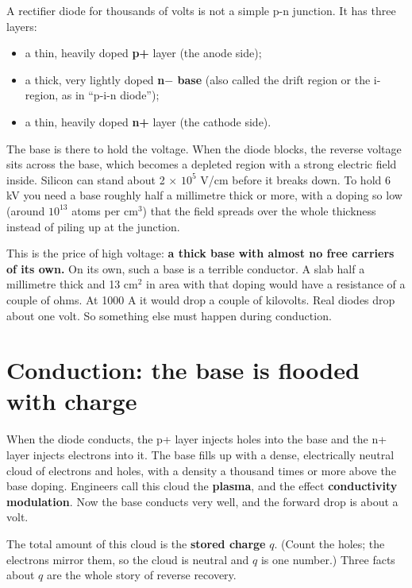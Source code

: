 \documentclass[11pt,a4paper,numbers=noenddot]{scrartcl}
\providecommand{\tightlist}{\setlength{\itemsep}{0pt}\setlength{\parskip}{0pt}}
\begin{document}
\begin{onehalfspace}
A rectifier diode for thousands of volts is not a simple p-n junction. It has three layers:

\begin{itemize}
\tightlist
\item
  a thin, heavily doped \textbf{p+} layer (the anode side);
\item
  a thick, very lightly doped \textbf{n\(-\) base} (also called the drift region or the i-region, as in ``p-i-n diode'');
\item
  a thin, heavily doped \textbf{n+} layer (the cathode side).
\end{itemize}

The base is there to hold the voltage. When the diode blocks, the reverse voltage sits across the base, which becomes a depleted region with a strong electric field inside. Silicon can stand about 2 \(\times\) \(10^{5}\) V/cm before it breaks down. To hold 6 kV you need a base roughly half a millimetre thick or more, with a doping so low (around \(10^{13}\) atoms per cm\(^{3}\)) that the field spreads over the whole thickness instead of piling up at the junction.

This is the price of high voltage: \textbf{a thick base with almost no free carriers of its own.} On its own, such a base is a terrible conductor. A slab half a millimetre thick and 13 cm\(^{2}\) in area with that doping would have a resistance of a couple of ohms. At 1000 A it would drop a couple of kilovolts. Real diodes drop about one volt. So something else must happen during conduction.

\section{Conduction: the base is flooded with charge}\label{conduction-the-base-is-flooded-with-charge}

When the diode conducts, the p+ layer injects holes into the base and the n+ layer injects electrons into it. The base fills up with a dense, electrically neutral cloud of electrons and holes, with a density a thousand times or more above the base doping. Engineers call this cloud the \textbf{plasma}, and the effect \textbf{conductivity modulation}. Now the base conducts very well, and the forward drop is about a volt.

The total amount of this cloud is the \textbf{stored charge} \(q\). (Count the holes; the electrons mirror them, so the cloud is neutral and \(q\) is one number.) Three facts about \(q\) are the whole story of reverse recovery.


\end{onehalfspace}
\end{document}
